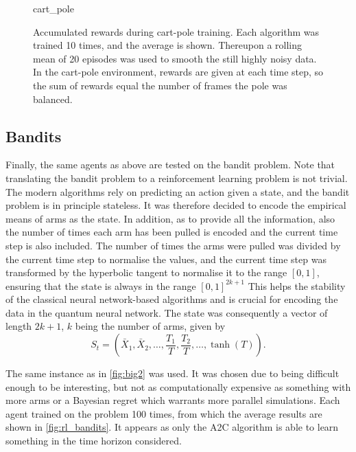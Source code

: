 \begin{figure}
    \centering
    \newcommand{\myoptions}{
        width=10cm,
        height=8cm,
        xlabel={Episode},
        ylabel={Sum of rewards},
        legend cell align=left,
        mystyle,
        legend entries={A2C, DQN, PPO, QNN},
    }
    {cart_pole}
    \caption[
        Accumulated rewards during cart-pole training.
    ]
    {
        Accumulated rewards during cart-pole training.
        Each algorithm was trained 10 times, and the average is shown.
        Thereupon a rolling mean of 20 episodes was used to smooth the still highly noisy data.
        In the cart-pole environment, rewards are given at each time step, so the sum of rewards equal the number of frames the pole was balanced.
    }
    \label{fig:cartpole_training}
\end{figure}

\subsection{Bandits}
Finally, the same agents as above are tested on the bandit problem.
Note that translating the bandit problem to a reinforcement learning problem is not trivial.
The modern algorithms rely on predicting an action given a state, and the bandit problem is in principle stateless.
It was therefore decided to encode the empirical means of arms as the state.
In addition, as to provide all the information, also the number of times each arm has been pulled is encoded and the current time step is also included.
The number of times the arms were pulled was divided by the current time step to normalise the values, and the current time step was transformed by the hyperbolic tangent to normalise it to the range $[0, 1]$, ensuring that the state is always in the range $[0, 1]^{2k+1}$
This helps the stability of the classical neural network-based algorithms and is crucial for encoding the data in the quantum neural network.
The state was consequently a vector of length $2k+1$, $k$ being the number of arms, given by
\begin{equation}
    \label{eq:rl_bandit_state}
    S_t = \left(
    \bar{X}_1,
    \bar{X}_2,
    \ldots,
    \frac{T_1}{T},
    \frac{T_2}{T},
    \ldots,
    \tanh(T)
    \right).
\end{equation}

The same instance as in \cref{fig:big2} was used.
It was chosen due to being difficult enough to be interesting, but not as computationally expensive as something with more arms or a Bayesian regret which warrants more parallel simulations.
Each agent trained on the problem 100 times, from which the average results are shown in \cref{fig:rl_bandits}.
It appears as only the A2C algorithm is able to learn something in the time horizon considered.

